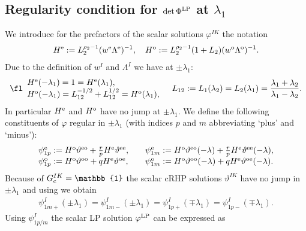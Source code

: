 \documentclass[12pt]{iopart}
\begin{document}
\subsection{Regularity condition for $\det \Phi^{\rm LP}$ at  $\lambda_1$} \label{s:detPhiLambda1}


We introduce for the prefactors of the scalar solutions $\varphi^{IK}$ the notation
\begin{eqnarray}
H^{\rm e}:=L_2^{\rho_2-1}(w^{\rm e}\Lambda^{\rm e})^{-1},\quad 
H^{\rm o}:=L_2^{\rho_2-1}(1+L_2)(w^{\rm o}\Lambda^{\rm o})^{-1}.
\end{eqnarray}
Due to the definition of $w^I$ and $\Lambda^I$ we have at $\pm\lambda_1$:
\begin{eqnarray}\fl\begin{array}{l}
H^{\rm e}(-\lambda_1)=1=H^{\rm e}(\lambda_1), \\
H^{\rm o}(-\lambda_1)=L_{12}^{-1/2}+L_{12}^{1/2}=H^{\rm o}(\lambda_1),
\end{array} \quad
L_{12}:=L_1(\lambda_2)=L_2(\lambda_1)=\frac{\lambda_1+\lambda_2}{\lambda_1-\lambda_2}. \label{L12}
\end{eqnarray}
In particular $H^{\rm e}$ and $H^{\rm o}$ have no jump at $\pm\lambda_1$. We define the following constituents of $\varphi$ regular in $\pm\lambda_1$ (with indices $p$ and $m$ abbreviating `plus' and `minus'):
\begin{equation}
\begin{array}{ll}
\psi_{1p}^{\rm e}:=H^{\rm o}\vartheta^{\rm eo}+\frac{r}{p} H^{\rm e}\vartheta^{\rm ee}, &\quad
\psi_{1m}^{\rm e}:=H^{\rm o}\vartheta^{\rm eo}(-\lambda)+\frac{r}{p} H^{\rm e}\vartheta^{\rm ee}(-\lambda), \\
\psi_{1p}^{\rm o}:=H^{\rm o}\vartheta^{\rm oo}+q H^{\rm e}\vartheta^{\rm oe}, &\quad
\psi_{1m}^{\rm o}:=H^{\rm o}\vartheta^{\rm oo}(-\lambda)+q H^{\rm e}\vartheta^{\rm oe}(-\lambda). \label{psiugpm}
\end{array}\end{equation}
Because of $G_{\rm c}^{IK}=\mathbb{1}$ the scalar cRHP solutions $\vartheta^{IK}$ have no jump in $\pm\lambda_1$ and using  we obtain
\begin{eqnarray}
\psi_{1m+}^I(\pm\lambda_1)=\psi_{1m-}^I(\pm\lambda_1)
=\psi_{1p+}^I(\mp\lambda_1)=\psi_{1p-}^I(\mp\lambda_1).\label{psipm}
\end{eqnarray}
Using $\psi_{1p/m}^I$ the scalar LP solution $\varphi^{\rm LP}$ can be expressed as
\end{document}
